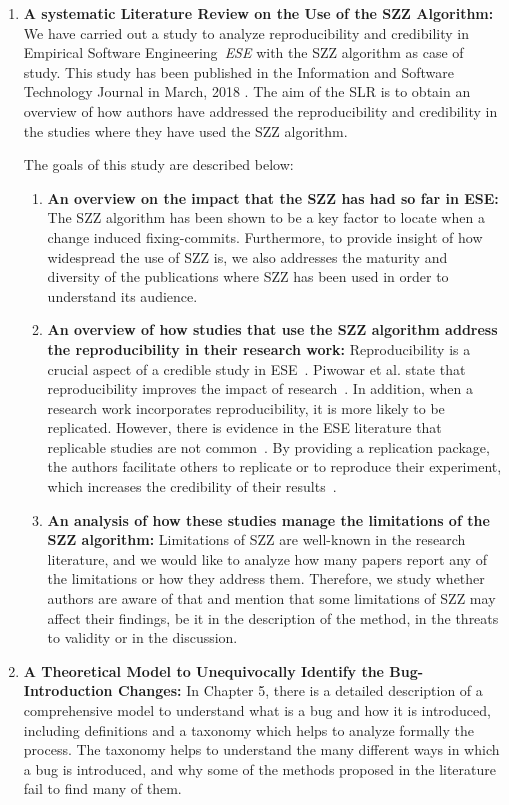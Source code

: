 \documentclass[a4paper, 12pt]{book}
\begin{document}
\begin{enumerate}
	\item\textbf{A systematic Literature Review on the Use of the SZZ Algorithm:} We have carried out a study to analyze reproducibility and credibility in Empirical Software Engineering~\emph{ESE} with the SZZ algorithm as case of study. This study has been published in the Information and Software Technology Journal in March, 2018 \cite{rodriguez2018reproducibility}. The aim of the SLR is to obtain an overview of how authors have addressed the reproducibility and credibility in the studies where they have used the SZZ algorithm.

	The goals of this study are described below:
	\begin{enumerate}
  		\item \textbf{An overview on the impact that the SZZ has had so far in ESE:} The SZZ algorithm has been shown to be a key factor to locate when a change induced fixing-commits. Furthermore, to provide insight of how widespread the use of SZZ is, we also addresses the maturity and diversity of the publications where SZZ has been used in order to understand its audience.
  		\item \textbf{An overview of how studies that use the SZZ algorithm address the reproducibility in their research work:} Reproducibility is a crucial aspect of a credible study in ESE~\cite{gonzalez2012reproducibility}. Piwowar et al. state that reproducibility improves the impact of research~\cite{piwowar2007sharing}. In addition, when a research work incorporates reproducibility, it is more likely to be replicated. However, there is evidence in the ESE literature that replicable studies are not common~\cite{robles2010replicating}. By providing a replication package, the authors facilitate others to replicate or to reproduce their experiment, which increases the credibility of their results~\cite{juristo2009using}.
 	 	\item \textbf{An analysis of how these studies manage the limitations of the SZZ algorithm:} Limitations of SZZ are well-known in the research literature, and we would like to analyze how many papers report any of the limitations or how they address them. Therefore, we study whether authors are aware of that and mention that some limitations of SZZ may affect their findings, be it in the description of the method, in the threats to validity or in the discussion.
	\end{enumerate}

	\item\textbf{A Theoretical Model to Unequivocally Identify the Bug-Introduction Changes:}
In Chapter 5, there is a detailed description of a comprehensive model to understand what is a bug and how it is introduced, including definitions and a taxonomy which helps to analyze formally the process. The taxonomy helps to understand the many different ways in which a bug is introduced, and why some of the methods proposed in the literature fail to find many of them. 


\end{enumerate}
\end{document}
